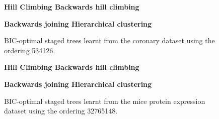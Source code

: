 \documentclass{tufte-book}
\begin{document}
\begin{figure}
   \begin{floatrow}
   \centering
   \textbf{\hspace{10mm}Hill Climbing \hspace{50mm} Backwards hill climbing}\par\medskip
{}%
\hfill
{}
   \end{floatrow}

   
      \begin{floatrow}
   \centering
   \textbf{\hspace{5mm}Backwards joining \hspace{55mm} Hierarchical clustering}\par\medskip
{}%
\hfill
{}%
   \end{floatrow}
   \caption{BIC-optimal staged trees learnt from the coronary dataset using the ordering 534126.}
\end{figure}

\begin{figure}
   \begin{floatrow}
   \centering
   \textbf{\hspace{10mm}Hill Climbing \hspace{50mm} Backwards hill climbing}\par\medskip
{}%
\hfill
{}
   \end{floatrow}

   
      \begin{floatrow}
   \centering
   \textbf{\hspace{5mm}Backwards joining \hspace{55mm} Hierarchical clustering}\par\medskip
{}%
\hfill
{}%
   \end{floatrow}
   \caption{BIC-optimal staged trees learnt from the mice protein expression dataset using the ordering 32765148.}
\end{figure}
\end{document}
